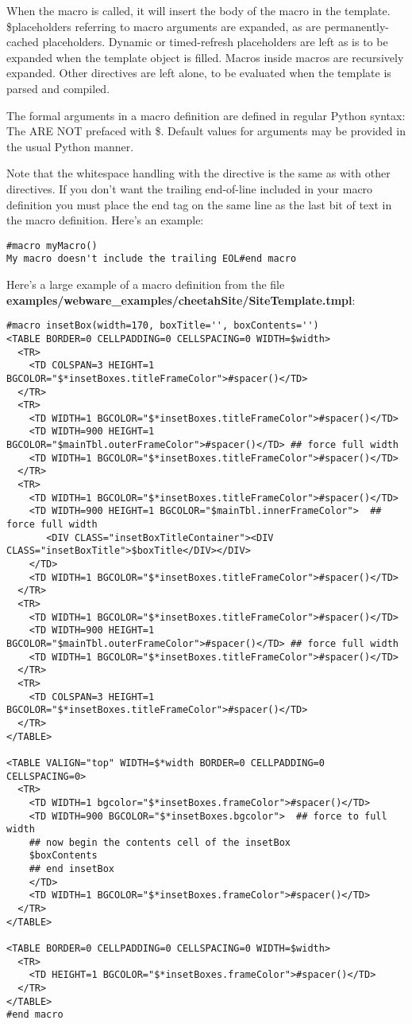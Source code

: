 When the macro is called, it will insert the body of the macro in the template.
\$placeholders referring to macro arguments are expanded, as are
permanently-cached placeholders.  Dynamic or timed-refresh placeholders are left
as is to be expanded when the template object is filled.  Macros inside macros are
recursively expanded.  Other directives are left alone, to be evaluated when the
template is parsed and compiled.

The formal arguments in a macro definition are defined in regular Python syntax:
The ARE NOT prefaced with \$.  Default values for arguments
may be provided in the usual Python manner.

Note that the whitespace handling with the  directive is the same
as with other directives.  If you don't want the trailing end-of-line included
in your macro definition you must place the end tag on the same line as the last
bit of text in the macro definition. Here's an example:

\begin{verbatim}
#macro myMacro()
My macro doesn't include the trailing EOL#end macro
\end{verbatim}


Here's a large example of a macro definition from the file
{\bf examples/webware\_examples/cheetahSite/SiteTemplate.tmpl}:

\begin{verbatim}
#macro insetBox(width=170, boxTitle='', boxContents='')
<TABLE BORDER=0 CELLPADDING=0 CELLSPACING=0 WIDTH=$width>
  <TR>
    <TD COLSPAN=3 HEIGHT=1 BGCOLOR="$*insetBoxes.titleFrameColor">#spacer()</TD>
  </TR>
  <TR>
    <TD WIDTH=1 BGCOLOR="$*insetBoxes.titleFrameColor">#spacer()</TD>
    <TD WIDTH=900 HEIGHT=1 BGCOLOR="$mainTbl.outerFrameColor">#spacer()</TD> ## force full width 
    <TD WIDTH=1 BGCOLOR="$*insetBoxes.titleFrameColor">#spacer()</TD>
  </TR>
  <TR>
    <TD WIDTH=1 BGCOLOR="$*insetBoxes.titleFrameColor">#spacer()</TD>
    <TD WIDTH=900 HEIGHT=1 BGCOLOR="$mainTbl.innerFrameColor">  ## force full width 
       <DIV CLASS="insetBoxTitleContainer"><DIV CLASS="insetBoxTitle">$boxTitle</DIV></DIV>
    </TD>
    <TD WIDTH=1 BGCOLOR="$*insetBoxes.titleFrameColor">#spacer()</TD>
  </TR>
  <TR>
    <TD WIDTH=1 BGCOLOR="$*insetBoxes.titleFrameColor">#spacer()</TD>
    <TD WIDTH=900 HEIGHT=1 BGCOLOR="$mainTbl.outerFrameColor">#spacer()</TD> ## force full width 
    <TD WIDTH=1 BGCOLOR="$*insetBoxes.titleFrameColor">#spacer()</TD>
  </TR>
  <TR>
    <TD COLSPAN=3 HEIGHT=1 BGCOLOR="$*insetBoxes.titleFrameColor">#spacer()</TD>
  </TR>
</TABLE>
            
<TABLE VALIGN="top" WIDTH=$*width BORDER=0 CELLPADDING=0 CELLSPACING=0>
  <TR>
    <TD WIDTH=1 bgcolor="$*insetBoxes.frameColor">#spacer()</TD>
    <TD WIDTH=900 BGCOLOR="$*insetBoxes.bgcolor">  ## force to full width 
    ## now begin the contents cell of the insetBox
    $boxContents
    ## end insetBox     
    </TD>
    <TD WIDTH=1 BGCOLOR="$*insetBoxes.frameColor">#spacer()</TD>
  </TR>
</TABLE>

<TABLE BORDER=0 CELLPADDING=0 CELLSPACING=0 WIDTH=$width>
  <TR>
    <TD HEIGHT=1 BGCOLOR="$*insetBoxes.frameColor">#spacer()</TD>
  </TR>
</TABLE>
#end macro
\end{verbatim}

